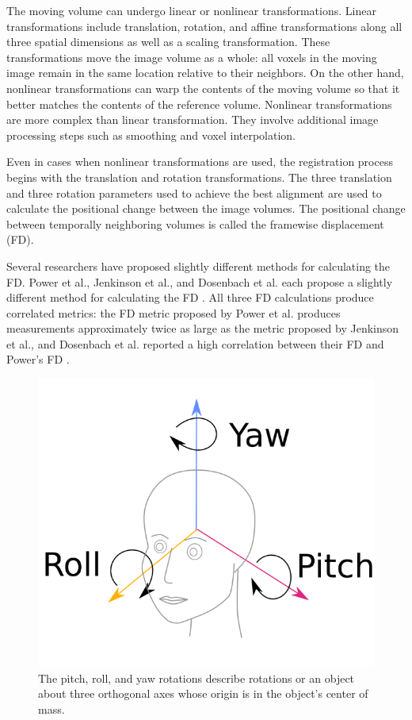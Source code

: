 The moving volume can undergo linear or nonlinear transformations. Linear transformations include translation, rotation, and affine transformations along all three spatial dimensions as well as a scaling transformation. These transformations move the image volume as a whole: all voxels in the moving image remain in the same location relative to their neighbors. On the other hand, nonlinear transformations can warp the contents of the moving volume so that it better matches the contents of the reference volume. Nonlinear transformations are more complex than linear transformation. They involve additional image processing steps such as smoothing and voxel interpolation.

Even in cases when nonlinear transformations are used, the registration process begins with the translation and rotation transformations. The three translation and three rotation parameters used to achieve the best alignment are used to calculate the positional change between the image volumes. The positional change between temporally neighboring volumes is called the framewise displacement (FD).  

Several researchers have proposed slightly different methods for calculating the FD. Power et al., Jenkinson et al., and Dosenbach et al. each propose a slightly different method for calculating the FD \cite{Power2012} \cite{Jenkinson2002} \cite{Dosenbach2017}. All three FD calculations produce correlated metrics: the FD metric proposed by Power et al. produces measurements approximately twice as large as the metric proposed by Jenkinson et al., and Dosenbach et al. reported a high correlation between their FD and Power’s FD \cite{Yan2013a} \cite{Dosenbach2017}. 

\begin{figure}
\centering
\includegraphics[width=.5\textwidth]{2/pitch_roll_yaw.png}
\caption{The pitch, roll, and yaw rotations describe rotations or an object about three orthogonal axes whose origin is in the object's center of mass.}
\label{fig:pry}
\end{figure}

